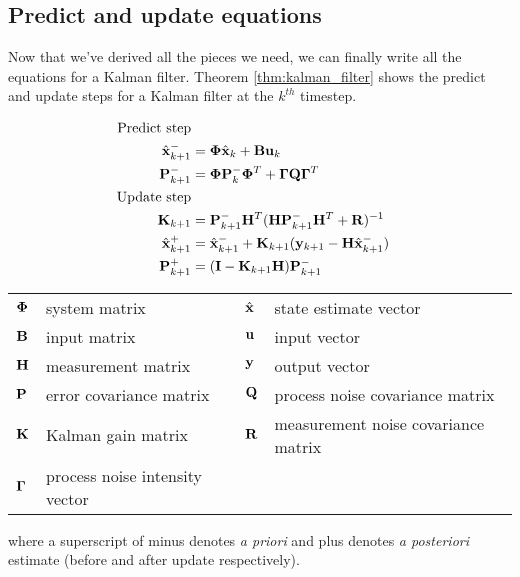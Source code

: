 \subsection{Predict and update equations}

Now that we've derived all the pieces we need, we can finally write all the
equations for a Kalman filter. Theorem \ref{thm:kalman_filter} shows the predict
and update steps for a Kalman filter at the $k^{th}$ timestep.

\begin{theorem}
  \begin{align}
    \text{Predict step} \nonumber \\
    \hat{\mathbf{x}}_{k+1}^- &= \mathbf{\Phi}\hat{\mathbf{x}}_k + \mathbf{B} \mathbf{u}_k
      \label{eq:pre1_x} \\
    \mathbf{P}_{k+1}^- &= \mathbf{\Phi} \mathbf{P}_k^- \mathbf{\Phi}^T +
      \mathbf{\Gamma}\mathbf{Q}\mathbf{\Gamma}^T \\
    \text{Update step} \nonumber \\
    \mathbf{K}_{k+1} &=
      \mathbf{P}_{k+1}^- \mathbf{H}^T (\mathbf{H}\mathbf{P}_{k+1}^- \mathbf{H}^T +
      \mathbf{R})^{-1} \\
    \hat{\mathbf{x}}_{k+1}^+ &=
      \hat{\mathbf{x}}_{k+1}^- + \mathbf{K}_{k+1}(\mathbf{y}_{k+1} -
      \mathbf{H} \hat{\mathbf{x}}_{k+1}^-) \label{eq:post1_x} \\
    \mathbf{P}_{k+1}^+ &= (\mathbf{I} - \mathbf{K}_{k+1}\mathbf{H})\mathbf{P}_{k+1}^-
  \end{align}

  \begin{figurekey}
    \begin{tabulary}{\linewidth}{LLLL}
      $\mathbf{\Phi}$ & system matrix & $\hat{\mathbf{x}}$ & state estimate vector \\
      $\mathbf{B}$ & input matrix            & $\mathbf{u}$ & input vector \\
      $\mathbf{H}$ & measurement matrix      & $\mathbf{y}$ & output vector \\
      $\mathbf{P}$ & error covariance matrix & $\mathbf{Q}$ & process noise covariance
        matrix \\
      $\mathbf{K}$ & Kalman gain matrix & $\mathbf{R}$ & measurement noise covariance
        matrix \\
      $\mathbf{\Gamma}$ & process noise intensity vector &
    \end{tabulary}
  \end{figurekey}

  where a superscript of minus denotes \textit{a priori} and plus denotes
  \textit{a posteriori} estimate (before and after update respectively).

  \label{thm:kalman_filter}
\end{theorem}

